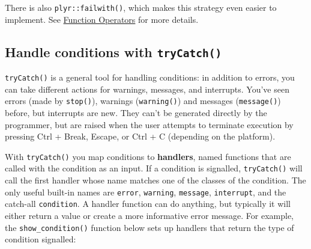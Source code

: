 \begin{Shaded}
\begin{Highlighting}[]
\StringTok{ }
\StringTok{ }\NormalTok{(}\NormalTok{), } \NormalTok{)}
\end{Highlighting}
\end{Shaded}

There is also \texttt{plyr::failwith()}, which makes this strategy even
easier to implement. See \hyperref[output-fos]{Function Operators} for
more details.

\subsection{Handle conditions with \texttt{tryCatch()}}

\texttt{tryCatch()} is a general tool for handling conditions: in
addition to errors, you can take different actions for warnings,
messages, and interrupts. You've seen errors (made by \texttt{stop()}),
warnings (\texttt{warning()}) and messages (\texttt{message()}) before,
but interrupts are new. They can't be generated directly by the
programmer, but are raised when the user attempts to terminate execution
by pressing Ctrl + Break, Escape, or Ctrl + C (depending on the
platform).  

With \texttt{tryCatch()} you map conditions to \textbf{handlers}, named
functions that are called with the condition as an input. If a condition
is signalled, \texttt{tryCatch()} will call the first handler whose name
matches one of the classes of the condition. The only useful built-in
names are \texttt{error}, \texttt{warning}, \texttt{message},
\texttt{interrupt}, and the catch-all \texttt{condition}. A handler
function can do anything, but typically it will either return a value or
create a more informative error message. For example, the
\texttt{show\_condition()} function below sets up handlers that return
the type of condition signalled: 


